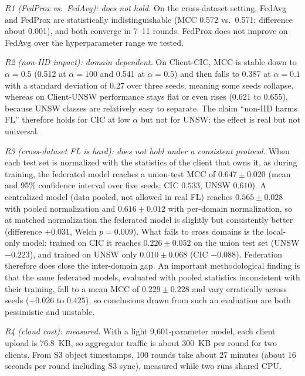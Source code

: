 \documentclass[conference]{IEEEtran}
\begin{document}
\textit{R1 (FedProx vs.\ FedAvg): does not hold.} On the cross-dataset setting, FedAvg
and FedProx are statistically indistinguishable (MCC 0.572 vs.\ 0.571; difference about
0.001), and both converge in 7--11 rounds. FedProx does not improve on FedAvg over the
hyperparameter range we tested.

\textit{R2 (non-IID impact): domain dependent.} On Client-CIC, MCC is stable down to
$\alpha{=}0.5$ (0.512 at $\alpha{=}100$ and 0.541 at $\alpha{=}0.5$) and then falls to 0.387
at $\alpha{=}0.1$ with a standard deviation of 0.27 over three seeds, meaning some seeds
collapse, whereas on Client-UNSW performance stays flat or even rises (0.621 to 0.655),
because UNSW classes are relatively easy to separate. The claim ``non-IID harms FL''
therefore holds for CIC at low $\alpha$ but not for UNSW: the effect is real but not
universal.

\textit{R3 (cross-dataset FL is hard): does not hold under a consistent protocol.} When each
test set is normalized with the statistics of the client that owns it, as during training,
the federated model reaches a union-test MCC of $0.647 \pm 0.020$ (mean and 95\% confidence
interval over five seeds; CIC $0.533$, UNSW $0.610$). A centralized model (data pooled, not
allowed in real FL) reaches $0.565 \pm 0.028$ with pooled normalization and $0.616 \pm 0.012$
with per-domain normalization, so at matched normalization the federated model is slightly but
consistently better (difference $+0.031$, Welch $p{=}0.009$). What fails to cross domains is the
local-only model: trained on CIC it reaches $0.226 \pm 0.052$ on the union test set (UNSW
$-0.223$), and trained on UNSW only $0.010 \pm 0.068$ (CIC $-0.088$). Federation therefore does
close the inter-domain gap. An important methodological finding is that the same federated
models, evaluated with pooled statistics inconsistent with their training, fall to a mean MCC of
$0.229 \pm 0.228$ and vary erratically across seeds ($-0.026$ to $0.425$), so conclusions drawn
from such an evaluation are both pessimistic and unstable.

\textit{R4 (cloud cost): measured.} With a light 9{,}601-parameter model, each client
upload is 76.8~KB, so aggregator traffic is about 300~KB per round for two clients.
From S3 object timestamps, 100 rounds take about 27 minutes (about 16 seconds per round
including S3 sync), measured while two runs shared CPU.
\end{document}
